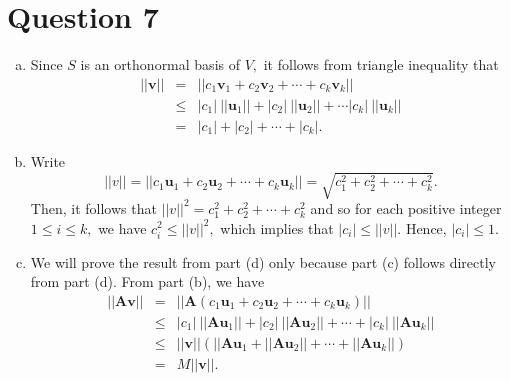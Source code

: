 \documentclass{article}
\begin{document}
\section*{Question 7}
\begin{enumerate}[(a)]
    \item Since $S$ is an orthonormal basis of $V,$ it follows from triangle inequality that \begin{eqnarray*}
    ||\textbf{v}||&=&||c_1\textbf{v}_1+c_2\textbf{v}_2+\cdots+c_k\textbf{v}_k||\\
    &\leq&|c_1|\ ||\textbf{u}_1||+|c_2|\ ||\textbf{u}_2||+\cdots|c_k|\ ||\textbf{u}_k||\\
    &=&|c_1|+|c_2|+\cdots+|c_k|.
    \end{eqnarray*}
    \item Write $$||v||=||c_1\textbf{u}_1+c_2\textbf{u}_2+\cdots+c_k\textbf{u}_k||=\sqrt{c_1^2+c^2_2+\cdots+c_k^2}.$$
    Then, it follows that $||v||^2=c_1^2+c_2^2+\cdots+c_k^2$ and so for each positive integer $1\leq i\leq k,$ we have $c_i^2\leq ||v||^2,$ which implies that $|c_i|\leq ||v||.$ Hence, $|c_i|\leq 1.$
    \setcounter{enumi}{3}
    \item We will prove the result from part (d) only because part (c) follows directly from part (d). From part (b), we have
    \begin{eqnarray*}
    ||\textbf{Av}||&=&||\textbf{A}(c_1\textbf{u}_1+c_2\textbf{u}_2+\cdots+c_k\textbf{u}_k)||\\
    &\leq&|c_1|\ ||\textbf{Au}_1||+|c_2|\ ||\textbf{Au}_2||+\cdots+|c_k|\ ||\textbf{Au}_k||\\
    &\leq&||\textbf{v}||\left(||\textbf{Au}_1+||\textbf{Au}_2||+\cdots+||\textbf{Au}_k||\right)\\
    &=&M||\textbf{v}||.
    \end{eqnarray*}
\end{enumerate}
\end{document}
